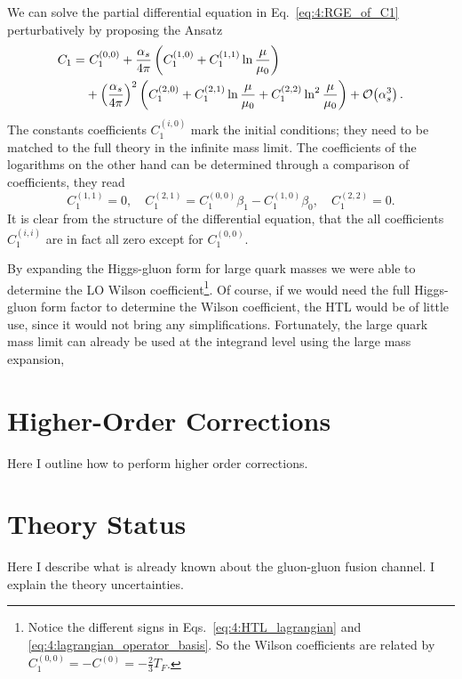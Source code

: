 We can solve the partial differential equation in Eq.~\eqref{eq:4:RGE_of_C1} perturbatively by proposing the Ansatz
\begin{equation}
\begin{split}
C_1 =  &\ C_1^{(0,0)} + \frac{\alpha_s}{4 \pi} \left(C_1^{(1,0)} + C_1^{(1, 1)} \ln \frac{\mu}{\mu_0} \right) \\
&+ \left(\frac{\alpha_s}{4 \pi} \right)^2 \left(C_1^{(2, 0)} + C_1^{(2, 1)} \ln \frac{\mu}{\mu_0} + C_1^{(2, 2)} \ln^2 \frac{\mu}{\mu_0} \right) + \mathcal{O}\!\left(\alpha_s^3\right).
\end{split}
\end{equation}
The constants coefficients $C_1^{(i, 0)}$ mark the initial conditions; they need to be matched to the full theory in the infinite mass limit. The coefficients of the logarithms on the other hand can be determined through a comparison of coefficients, they read
\begin{equation}
C_1^{(1,1)} = 0, \quad C_1^{(2, 1)} = C_1^{(0,0)} \beta_1 - C_1^{(1, 0)} \beta_0, \quad C_1^{(2, 2)} = 0.
\end{equation}
It is clear from the structure of the differential equation, that the all coefficients $C_1^{(i, i)}$ are in fact all zero except for $C_1^{(0,0)}$.

By expanding the Higgs-gluon form for large quark masses we were able to determine the \acs{LO} Wilson coefficient\footnote{Notice the different signs in Eqs.~\eqref{eq:4:HTL_lagrangian} and \eqref{eq:4:lagrangian_operator_basis}. So the Wilson coefficients are related by $C_1^{(0,0)} = - C^{(0)} = -\frac{2}{3}T_F$.}. Of course, if we would need the full Higgs-gluon form factor to determine the Wilson coefficient, the \acs{HTL} would be of little use, since it would not bring any simplifications. Fortunately, the large quark mass limit can already be used at the integrand level using the large mass expansion,



\section{Higher-Order Corrections}
Here I outline how to perform higher order corrections.
\section{Theory Status}
Here I describe what is already known about the gluon-gluon fusion channel. I explain the theory uncertainties.

